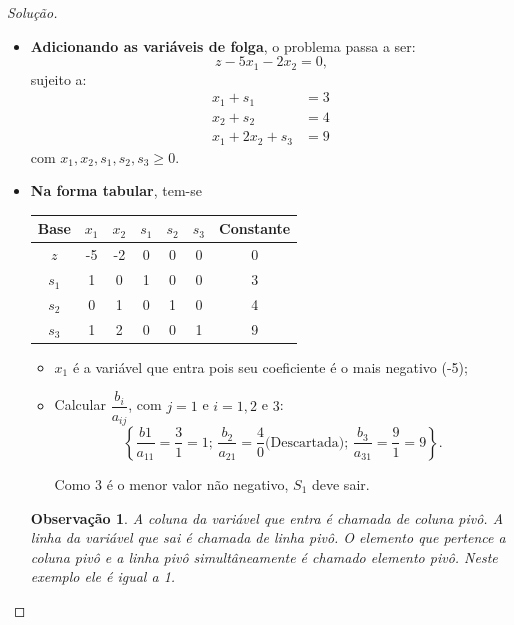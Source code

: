 \documentclass[
	12pt,				%
	openright,			%
	twoside,			%
	a4paper,			%
	english,			%
	french,				%
	brazil,				%
	sumario=tradicional
]{abntex2}
\newtheorem{remark}{Observação}
\newenvironment{solution}{
	\begin{proof}[Solução]
}{\end{proof}}
\numberwithin{example}{chapter}
\numberwithin{remark}{chapter}
\numberwithin{definition}{chapter}
\numberwithin{figure}{chapter}
\begin{document}
\begin{solution}\hfill
	\begin{itemize}
		\item \textbf{Adicionando as variáveis de folga}, o problema passa a ser:
		$$z-5x_1-2x_2=0\text{,}$$
		sujeito a:
		\begin{align*}
			x_1 + s_1 & = 3\\
			x_2 + s_2 & = 4\\
			x_1 + 2x_2 + s_3 & = 9
		\end{align*}
		com $x_1, x_2, s_1, s_2, s_3 \geqslant 0$.
		
		\item \textbf{Na forma tabular}, tem-se
		\begin{table}[h]
			\centering
			\begin{tabular}{|c|c|c|c|c|c|c|}
				\hline
				Base & $x_1$ & $x_2$ & $s_1$ & $s_2$ & $s_3$ & Constante \\
		        \hline
		        $z$ & -5 & -2 & 0 & 0 & 0 & 0\\
		        \hline
		        $s_1$ & 1 & 0 & 1 & 0 & 0 & 3\\
		        \hline
		        $s_2$ & 0 & 1 & 0 & 1 & 0 & 4\\
		        \hline
		        $s_3$ & 1 & 2 & 0 & 0 & 1 & 9\\
		        \hline
			\end{tabular}
		\end{table}
		
		\begin{itemize}
			\item $x_1$ é a variável que entra pois seu coeficiente é o mais negativo (-5);
			
			\item Calcular $\dfrac{b_i}{a_{ij}}$, com $j=1$ e $i=1,2$ e $3$: 
			$$\left \{ \dfrac{b1}{a_{11}}=\dfrac{3}{1}=1\text{; } \dfrac{b_2}{a_{21}}=\dfrac{4}{0}\text{(Descartada); } \dfrac{b_3}{a_{31}}=\dfrac{9}{1}=9 \right \}\text{.}$$
			
			Como $3$ é o menor valor não negativo, $S_1$ deve sair.
		\end{itemize}
		
		\begin{remark}
			A coluna da variável que entra é chamada de coluna pivô. A linha da variável que sai é chamada de linha pivô. O elemento que pertence a coluna pivô e a linha pivô simultâneamente é chamado elemento pivô. Neste exemplo ele é igual a 1.
		\end{remark}
		

\end{itemize}
\end{solution}
\end{document}
